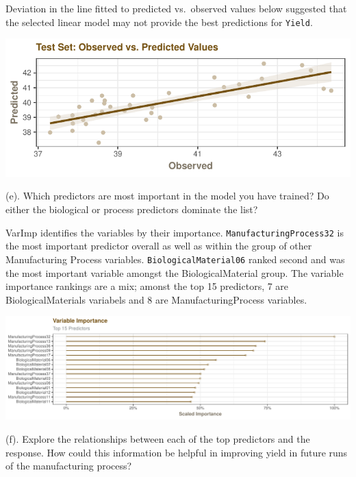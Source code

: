 \documentclass[]{report}
\begin{document}
Deviation in the line fitted to predicted vs.~observed values below
suggested that the selected linear model may not provide the best
predictions for \texttt{Yield}.

\begin{center}\includegraphics{AppliedPredictiveModeling_treebased_regression_files/figure-latex/kj-6.3d-2-1} \end{center}

\begin{subquestion}{(e).} Which predictors are most important in the model you have trained? Do either the biological or process predictors dominate the list? 
\end{subquestion}

VarImp identifies the variables by their importance.
\texttt{ManufacturingProcess32} is the most important predictor overall
as well as within the group of other Manufacturing Process variables.
\texttt{BiologicalMaterial06} ranked second and was the most important
variable amongst the BiologicalMaterial group. The variable importance
rankings are a mix; amonst the top 15 predictors, 7 are
BiologicalMaterials variabels and 8 are ManufacturingProcess variables.

\includegraphics{AppliedPredictiveModeling_treebased_regression_files/figure-latex/kj-6.3e-1.pdf}

\begin{subquestion}{(f).} Explore the relationships between each of the top predictors and the response. How could this information be helpful in improving yield in future runs of the manufacturing process?
\end{subquestion}
\end{document}
